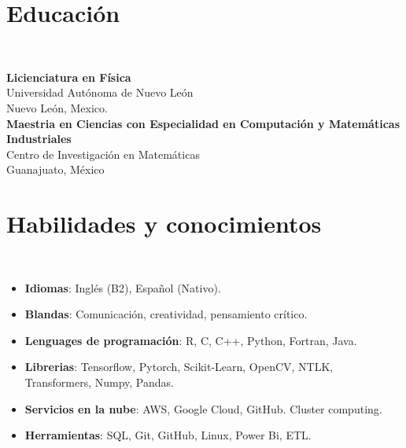 \documentclass[a3paper]{adcv_color}
\begin{document}
\begin{addmargin}[0.5em]{0.5em}

\end{addmargin}
\begin{minipage}{0.35\linewidth}
	\section{Educación}\\
	\begin{addmargin}[0.5em]{0.5em}
		\textbf{Licienciatura en Física} \\
		Universidad Autónoma de Nuevo León\\
		Nuevo León, Mexico.\\

		\textbf{Maestria en Ciencias con Especialidad en Computación y Matemáticas Industriales}\\
		Centro de Investigación en Matemáticas\\
		Guanajuato, México
	\end{addmargin}
\end{minipage}
\begin{minipage}{0.65\linewidth}
	\section{Habilidades y conocimientos}\\
	\begin{addmargin}[0.5em]{0.5em}
		\begin{itemize}[label={}]
			\setlength\itemsep{0em}
			\item \textbf{Idiomas}: Inglés (B2), Español (Nativo).
			\item \textbf{Blandas}:
				Comunicación, creatividad, pensamiento crítico.
			\item \textbf{Lenguages de programación}:
				R, C, C++, Python, Fortran, Java.
			\item \textbf{Librerias}:
				Tensorflow, Pytorch, Scikit-Learn, OpenCV, NTLK, Transformers, Numpy, Pandas.
			\item \textbf{Servicios en la nube}:
				AWS, Google Cloud, GitHub. Cluster computing.
			\item \textbf{Herramientas}:
				SQL, Git, GitHub, Linux, Power Bi, ETL.
		\end{itemize}
	\end{addmargin}
\end{minipage}
\end{document}
